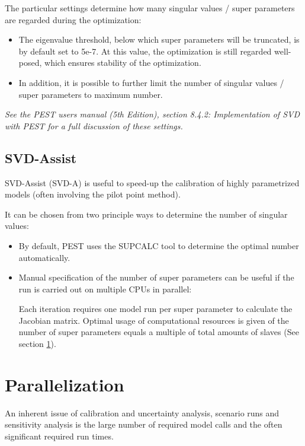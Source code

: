 The particular settings determine how many singular values / super parameters are regarded during the optimization:

\begin{itemize}
\item The eigenvalue threshold, below which super parameters will be truncated, is by default set to 5e-7. At this value, the optimization is still regarded well-posed, which ensures stability of the optimization.

\item In addition, it is possible to further limit the number of singular values / super parameters to maximum number.
\end{itemize}

\textit{See the PEST users manual (5th Edition), section 8.4.2: Implementation of SVD with PEST for a full discussion of these settings.}

\subsection{SVD-Assist}

SVD-Assist (SVD-A) is useful to speed-up the calibration of highly parametrized models (often involving the pilot point method).

It can be chosen from two principle ways to determine the number of singular values:

\begin{itemize}

\item By default, PEST uses the SUPCALC tool to determine the optimal number automatically.

\item Manual specification of the number of super parameters can be useful if the run is carried out on multiple CPUs in parallel:

Each iteration requires one model run per super parameter to calculate the Jacobian matrix. Optimal usage of computational resources is given of the number of super parameters equals a multiple of total amounts of slaves (See section \ref{sec:fepest:parralelization}).
\end{itemize}

\section{Parallelization}
\label{sec:fepest:parralelization}

An inherent issue of calibration and uncertainty analysis, scenario runs and sensitivity analysis is the large number of required model calls and the often significant required run times.

